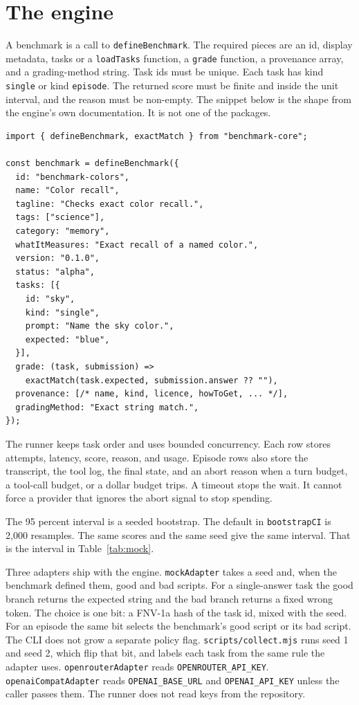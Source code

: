 \section{The engine}
\label{app:engine}

A benchmark is a call to \texttt{defineBenchmark}. The required pieces are an id, display metadata, tasks or a \texttt{loadTasks} function, a \texttt{grade} function, a provenance array, and a grading-method string. Task ids must be unique. Each task has kind \texttt{single} or kind \texttt{episode}. The returned score must be finite and inside the unit interval, and the reason must be non-empty. The snippet below is the shape from the engine's own documentation. It is not one of the \suitePackages{} packages.

\begin{verbatim}
import { defineBenchmark, exactMatch } from "benchmark-core";

const benchmark = defineBenchmark({
  id: "benchmark-colors",
  name: "Color recall",
  tagline: "Checks exact color recall.",
  tags: ["science"],
  category: "memory",
  whatItMeasures: "Exact recall of a named color.",
  version: "0.1.0",
  status: "alpha",
  tasks: [{
    id: "sky",
    kind: "single",
    prompt: "Name the sky color.",
    expected: "blue",
  }],
  grade: (task, submission) =>
    exactMatch(task.expected, submission.answer ?? ""),
  provenance: [/* name, kind, licence, howToGet, ... */],
  gradingMethod: "Exact string match.",
});
\end{verbatim}

The runner keeps task order and uses bounded concurrency. Each row stores attempts, latency, score, reason, and usage. Episode rows also store the transcript, the tool log, the final state, and an abort reason when a turn budget, a tool-call budget, or a dollar budget trips. A timeout stops the wait. It cannot force a provider that ignores the abort signal to stop spending.

The 95 percent interval is a seeded bootstrap. The default in \texttt{bootstrapCI} is 2{,}000 resamples. The same scores and the same seed give the same interval. That is the interval in Table~\ref{tab:mock}.

Three adapters ship with the engine. \texttt{mockAdapter} takes a seed and, when the benchmark defined them, good and bad scripts. For a single-answer task the good branch returns the expected string and the bad branch returns a fixed wrong token. The choice is one bit: a FNV-1a hash of the task id, mixed with the seed. For an episode the same bit selects the benchmark's good script or its bad script. The CLI does not grow a separate policy flag. \texttt{scripts/collect.mjs} runs seed 1 and seed 2, which flip that bit, and labels each task from the same rule the adapter uses. \texttt{openrouterAdapter} reads \texttt{OPENROUTER\_API\_KEY}. \texttt{openaiCompatAdapter} reads \texttt{OPENAI\_BASE\_URL} and \texttt{OPENAI\_API\_KEY} unless the caller passes them. The runner does not read keys from the repository.

